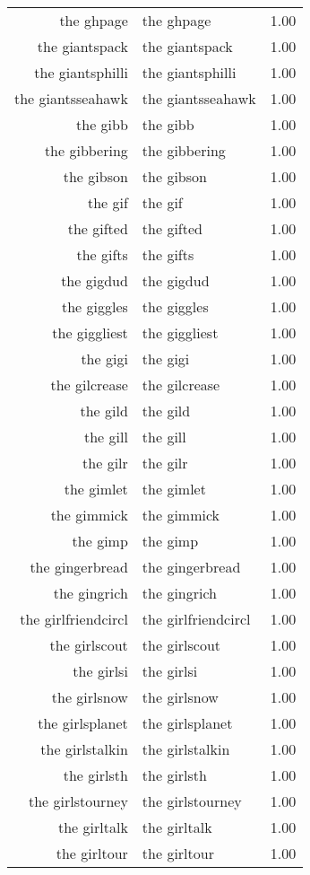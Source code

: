 \begin{table}[ht]
\begin{tabular}{rlr}
  the ghpage & the ghpage & 1.00 \\ 
  the giantspack & the giantspack & 1.00 \\ 
  the giantsphilli & the giantsphilli & 1.00 \\ 
  the giantsseahawk & the giantsseahawk & 1.00 \\ 
  the gibb & the gibb & 1.00 \\ 
  the gibbering & the gibbering & 1.00 \\ 
  the gibson & the gibson & 1.00 \\ 
  the gif & the gif & 1.00 \\ 
  the gifted & the gifted & 1.00 \\ 
  the gifts & the gifts & 1.00 \\ 
  the gigdud & the gigdud & 1.00 \\ 
  the giggles & the giggles & 1.00 \\ 
  the giggliest & the giggliest & 1.00 \\ 
  the gigi & the gigi & 1.00 \\ 
  the gilcrease & the gilcrease & 1.00 \\ 
  the gild & the gild & 1.00 \\ 
  the gill & the gill & 1.00 \\ 
  the gilr & the gilr & 1.00 \\ 
  the gimlet & the gimlet & 1.00 \\ 
  the gimmick & the gimmick & 1.00 \\ 
  the gimp & the gimp & 1.00 \\ 
  the gingerbread & the gingerbread & 1.00 \\ 
  the gingrich & the gingrich & 1.00 \\ 
  the girlfriendcircl & the girlfriendcircl & 1.00 \\ 
  the girlscout & the girlscout & 1.00 \\ 
  the girlsi & the girlsi & 1.00 \\ 
  the girlsnow & the girlsnow & 1.00 \\ 
  the girlsplanet & the girlsplanet & 1.00 \\ 
  the girlstalkin & the girlstalkin & 1.00 \\ 
  the girlsth & the girlsth & 1.00 \\ 
  the girlstourney & the girlstourney & 1.00 \\ 
  the girltalk & the girltalk & 1.00 \\ 
  the girltour & the girltour & 1.00 \\ 

\end{tabular}
\end{table}

